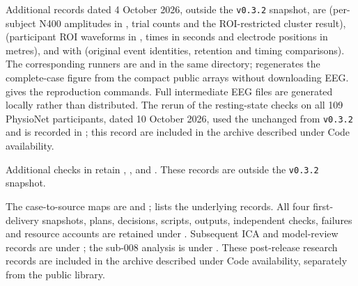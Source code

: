 Additional records dated 4 October 2026, outside the \texttt{v0.3.2} snapshot, are  (per-subject N400 amplitudes in \uV{}, trial counts and the ROI-restricted cluster result),  (participant ROI waveforms in \uV{}, times in seconds and electrode positions in metres), and  with  (original event identities, retention and timing comparisons). The corresponding runners are  and  in the same directory;  regenerates the complete-case figure from the compact public arrays without downloading EEG.  gives the reproduction commands. Full intermediate EEG files are generated locally rather than distributed. The rerun of the resting-state checks on all 109 PhysioNet participants, dated 10 October 2026, used the unchanged  from \texttt{v0.3.2} and is recorded in ; this record are included in the archive described under Code availability.

Additional checks in  retain , ,  and . These records are outside the \texttt{v0.3.2} snapshot.

The case-to-source maps are  and ;  lists the underlying records. All four first-delivery snapshots, plans, decisions, scripts, outputs, independent checks, failures and resource accounts are retained under . Subsequent ICA and model-review records are under ; the sub-008 analysis is under . These post-release research records are included in the archive described under Code availability, separately from the public library.

